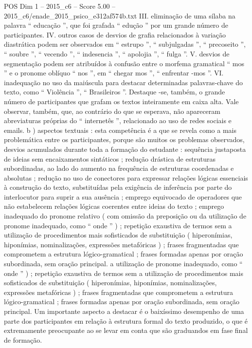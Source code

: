 \begin{textsample}{POS Dim 1 – 2015\_c6 – Score 5.00 – 2015\_c6/enade\_2015\_psico\_e312af574b.txt}
III. eliminação de uma sílaba na palavra “ educação ”, que foi grafada “ edução ” por um grande número de participantes.
IV. outros casos de desvios de grafia relacionados à variação diastrática podem ser observados em “ estrupo ”, “ subjulgadas ”, “ precoseito ”, “ soubre ”, “ vecendo ”, “ indesencia ”, “ apolojia ”, “ fulga ”.
V. desvios de segmentação podem ser atribuídos à confusão entre o morfema gramatical “ mos ” e o pronome oblíquo “ nos ”, em “ chegar mos ”, “ enfrentar -mos ”.
VI. inadequação no uso da maiúscula para destacar determinadas palavras-chave do texto, como “ Violência ”, “ Brasileiros ”.
Destaque -se, também, o grande número de participantes que grafam os textos inteiramente em caixa alta.
Vale observar, também, que, ao contrário do que se esperava, não apareceram abreviaturas próprias do “ internetês ”, relacionado ao uso de redes sociais e emails. b ) aspectos textuais : esta competência é a que se revela como a mais problemática entre os participantes, porque são muitos os problemas observados, desvios acumulados durante toda a formação do estudante : sequência justaposta de ideias sem encaixamentos sintáticos ; redução drástica de estruturas subordinadas, ao lado do aumento na frequência de estruturas coordenadas e absolutas ; redução no uso de conectores para expressar relações lógicas essenciais à construção do texto, substituídas pela exigência de inferência por parte do interlocutor para suprir a sua ausência ; emprego equivocado de operadores que não estabelecem relações lógicas coerentes entre ideias do texto ; emprego inadequado do pronome relativo ( com omissão da preposição ou da utilização de pronome inadequado, como “ onde ” ) ; repetição exaustiva de termos sem a utilização de procedimentos mais sofisticados de substituição ( hiperonímias, hiponímias, nominalizações, expressões metafóricas ) ; frases fragmentadas que comprometem a estrutura lógico-gramatical ; frases formadas apenas por oração subordinada, sem oração principal. a utilização de pronome inadequado, como “ onde ” ) ; repetição exaustiva de termos sem a utilização de procedimentos mais sofisticados de substituição ( hiperonímias, hiponímias, nominalizações, expressões metafóricas ) ; frases fragmentadas que comprometem a estrutura lógico-gramatical ; frases formadas apenas por oração subordinada, sem oração principal.
Um importante aspecto a destacar é o baixíssimo desempenho de uma parte dos participantes em relação à estrutura formal do texto produzido, o que é extremamente preocupante ao se levar em conta que são graduandos em fase final de formação.

\end{textsample}
